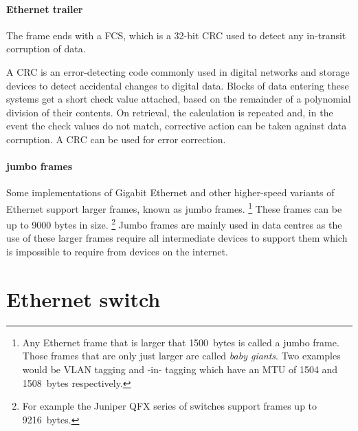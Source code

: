 \paragraph{Ethernet trailer}
The frame ends with a \acf{FCS}, which is a 32-bit \acf{CRC} used to detect any in-transit corruption of data.

A \acs{CRC} is an error-detecting code commonly used in digital networks and storage devices to detect accidental changes to digital data.
Blocks of data entering these systems get a short check value attached, based on the remainder of a polynomial division of their contents.
On retrieval, the calculation is repeated and, in the event the check values do not match, corrective action can be taken against data corruption.
A \acs{CRC} can be used for error correction.

\paragraph{jumbo frames} 
Some implementations of Gigabit Ethernet and other higher-speed variants of Ethernet support larger frames, known as jumbo frames.%
   \footnote{%
      Any Ethernet frame that is larger that {1500}~bytes is called a jumbo frame.
      Those frames that are only just larger are called \emph{baby giants}.
      Two examples would be \acs{VLAN} tagging and -in- tagging which have an \acs{MTU} of {1504} and {1508}~bytes respectively.}
These frames can be up to 9000 bytes in size.%
   \footnote{For example the Juniper QFX series of switches support frames up to {9216}~bytes.}
Jumbo frames are mainly used in data centres as the use of these larger frames require all intermediate devices to support them which is impossible to require from devices on the internet.






\section{Ethernet switch}
\label{sec:ethernet-switch}


